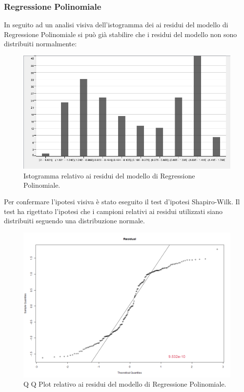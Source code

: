 \documentclass[12pt, a4paper, twocolumn]{article} %
\begin{document}
\subsubsection{Regressione Polinomiale}
In seguito ad un analisi visiva dell'istogramma dei ai residui del modello di Regressione Polinomiale si può già stabilire che i residui del modello non sono distribuiti normalmente:
\begin{figure}[H]
  \includegraphics[scale=0.4]{./Immagini/hist-polinomial-regression.png}
  \caption{Istogramma relativo ai residui del modello di Regressione Polinomiale.}
\end{figure}
Per confermare l'ipotesi visiva è stato eseguito il test d'ipotesi Shapiro-Wilk. Il test ha rigettato l'ipotesi che i campioni relativi ai residui utilizzati siano distribuiti seguendo una distribuzione normale.
\begin{figure}[H]
  \includegraphics[scale=0.25]{./Immagini/qq-plot-polinomial-regression.png}
  \caption{Q Q Plot relativo ai residui del modello di Regressione Polinomiale.}
\end{figure}


\printbibliography[title={Bibliography}] %

\end{document}
